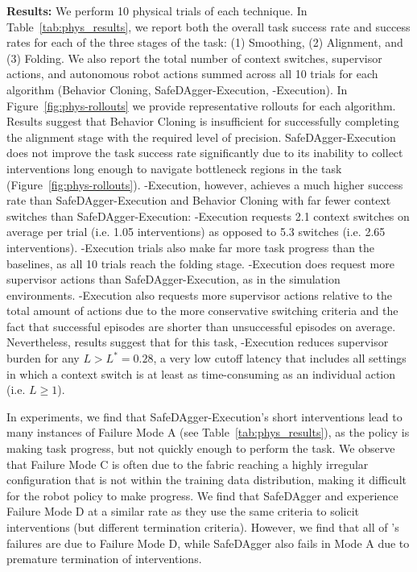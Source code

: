 \textbf{Results: }
We perform 10 physical trials of each technique. In Table~\ref{tab:phys_results}, we report both the overall task success rate and success rates for each of the three stages of the task: (1) Smoothing, (2) Alignment, and (3) Folding. We also report the total number of context switches, supervisor actions, and autonomous robot actions summed across all 10 trials for each algorithm (Behavior Cloning, SafeDAgger-Execution, \algname-Execution). In Figure~\ref{fig:phys-rollouts} we provide representative rollouts for each algorithm. Results suggest that Behavior Cloning is insufficient for successfully completing the alignment stage with the required level of precision. SafeDAgger-Execution does not improve the task success rate significantly due to its inability to collect interventions long enough to navigate bottleneck regions in the task (Figure~\ref{fig:phys-rollouts}). \algname-Execution, however, achieves a much higher success rate than SafeDAgger-Execution and Behavior Cloning with far fewer context switches than SafeDAgger-Execution: \algname-Execution requests 2.1 context switches on average per trial (i.e. 1.05 interventions) as opposed to 5.3 switches (i.e. 2.65 interventions). \algname-Execution trials also make far more task progress than the baselines, as all 10 trials reach the folding stage. \algname-Execution does request more supervisor actions than SafeDAgger-Execution, as in the simulation environments. \algname-Execution also requests more supervisor actions relative to the total amount of actions due to the more conservative switching criteria and the fact that successful episodes are shorter than unsuccessful episodes on average. Nevertheless, results suggest that for this task, \algname-Execution reduces supervisor burden for any $L > L^* = 0.28$, a very low cutoff latency that includes all settings in which a context switch is at least as time-consuming as an individual action (i.e. $L \geq 1$).

In experiments, we find that SafeDAgger-Execution's short interventions lead to many instances of Failure Mode A (see Table~\ref{tab:phys_results}), as the policy is making task progress, but not quickly enough to perform the task. We observe that Failure Mode C is often due to the fabric reaching a highly irregular configuration that is not within the training data distribution, making it difficult for the robot policy to make progress. We find that SafeDAgger and \algname experience Failure Mode D at a similar rate as they use the same criteria to solicit interventions (but different termination criteria). However, we find that all of \algname's failures are due to Failure Mode D, while SafeDAgger also fails in Mode A due to premature termination of interventions.


